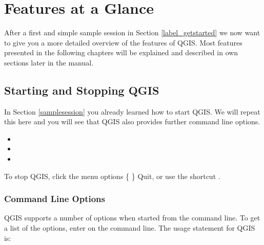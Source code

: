 
\chapter{Features at a Glance}\label{feature_glance}

\updatedisclaimer

After a first and simple sample session in Section \ref{label_getstarted} we now
want to give you a more detailed overview of the features of QGIS.
Most features presented in the following chapters will be explained and described in
own sections later in the manual.

\section{Starting and Stopping QGIS}\label{label_startinqgis}

In Section \ref{samplesession} you already learned how to start QGIS. We will
repeat this here and you will see that QGIS also provides further command line options.

\begin{itemize}
\item {}
\item {}
\item {}
\end{itemize}

To stop QGIS, click the menu options \{\nix{} \} \arrow Quit,
or use the shortcut .

\subsection{Command Line Options}
\label{label_commandline}

\nix QGIS supports a number of options when started from the command line. To
get a list of the options, enter  on the command line.
The usage statement for QGIS is:

